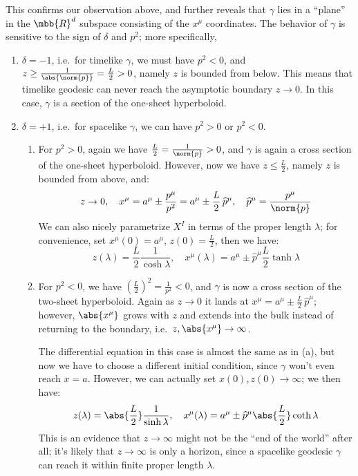 \documentclass[a4paper,10pt]{article}
\begin{document}
	This confirms our observation above, and further reveals that $\gamma$ lies in a ``plane'' in the $\mbb{R}^d$ subspace consisting of the $x^\mu$ coordinates. The behavior of $\gamma$ is sensitive to the sign of $\delta$ and $p^2$; more specifically,
	\begin{enumerate}
	\item $\delta = -1$, i.e.~for timelike $\gamma$, we must have $p^2 < 0$, and $z \ge \frac{1}{\abs{\norm{p}}} = \frac{L}{2} > 0$, namely $z$ is bounded from below. This means that timelike geodesic can never reach the asymptotic boundary $z \to 0$. In this case, $\gamma$ is a section of the one-sheet hyperboloid. 
	\item $\delta = +1$, i.e.~for spacelike $\gamma$, we can have $p^2 > 0$ or $p^2 < 0$.
		\begin{enumerate}
		\item For $p^2 > 0$, again we have $\frac{L}{2} = \frac{1}{\norm{p}} > 0$, and $\gamma$ is again a cross section of the one-sheet hyperboloid. However, now we have $z \le \frac{L}{2}$, namely $z$ is bounded from above, and:
		\begin{equation}
			z\to 0,
		\quad
			x^\mu
			= a^\mu \pm \frac{p^\mu}{p^2}
			= a^\mu \pm \frac{L}{2}\,\widehat{p}^\mu,
		\quad
			\widehat{p}^\mu = \frac{p^\mu}{\norm{p}}
		\end{equation}
		We can also nicely parametrize $X^I$ in terms of the proper length $\lambda$; for convenience, set $x^\mu(0) = a^\mu$, $z(0) = \frac{L}{2}$, then we have:
		\begin{equation}
			z(\lambda)
			= \frac{L}{2} \frac{1}{\cosh \lambda},
		\quad
			x^\mu(\lambda)
			= a^\mu \pm \widehat{p}^\mu \frac{L}{2}
				\tanh \lambda
		\label{eq:elliptic}
		\end{equation}
		
		\item For $p^2 < 0$, we have $(\frac{L}{2})^2 = \frac{1}{p^2} < 0$, and $\gamma$ is now a cross section of the two-sheet hyperboloid. Again as $z\to 0$ it lands at $x^\mu = a^\mu \pm \frac{L}{2}\,\widehat{p}^\mu$; however, $\abs{x^\mu}$ grows with $z$ and extends into the bulk instead of returning to the boundary, i.e.~$z,\abs{x^\mu} \to \infty$. 
		
		The differential equation in this case is almost the same as in (a), but now we have to choose a different initial condition, since $\gamma$ won't even reach $x = a$. However, we can actually set $x(0),z(0) \to \infty$; we then have:
		\begin{equation}
			z(\lambda)
			= \abs{\frac{L}{2}} \frac{1}{\sinh \lambda},
		\quad
			x^\mu(\lambda)
			= a^\mu \pm \widehat{p}^\mu \abs{\frac{L}{2}}
				\coth \lambda
		\label{eq:hyperbolic}
		\end{equation}
		This is an evidence that $z\to\infty$ might not be the ``end of the world'' after all; it's likely that $z\to\infty$ is only a horizon, since a spacelike geodesic $\gamma$ can reach it within finite proper length $\lambda$. 
		
		\end{enumerate}
	
	\end{enumerate}
	
\end{document}
